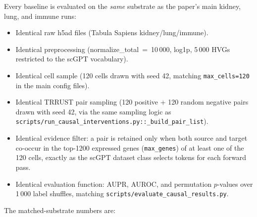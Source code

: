 \documentclass[11pt,letterpaper]{article}
\begin{document}
Every baseline is evaluated on the \emph{same} substrate as the paper's
main kidney, lung, and immune runs:
\begin{itemize}[leftmargin=2em]
\item Identical raw h5ad files (Tabula Sapiens kidney/lung/immune).
\item Identical preprocessing (normalize\_total~=~10\,000, log1p, 5\,000 HVGs
  restricted to the scGPT vocabulary).
\item Identical cell sample (120 cells drawn with seed 42, matching
  \texttt{max\_cells=120} in the main config files).
\item Identical TRRUST pair sampling (120 positive + 120 random negative
  pairs drawn with seed 42, via the same sampling logic as
  \texttt{scripts/run\_causal\_interventions.py::\_build\_pair\_list}).
\item Identical evidence filter: a pair is retained only when both source
  and target co-occur in the top-1200 expressed genes (\texttt{max\_genes}) of
  at least one of the 120 cells, exactly as the scGPT dataset class selects
  tokens for each forward pass.
\item Identical evaluation function: AUPR, AUROC, and permutation
  $p$-values over 1\,000 label shuffles, matching
  \texttt{scripts/evaluate\_causal\_results.py}.
\end{itemize}

The matched-substrate numbers are:
\end{document}
